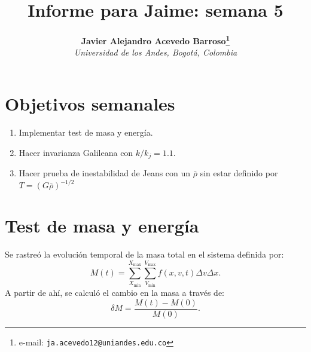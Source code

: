 \documentclass[notitlepage,letterpaper,12pt]{article} %
\begin{document}
\title{Informe para Jaime: semana 5}
\author{
\textbf{Javier Alejandro Acevedo Barroso\thanks{e-mail: \texttt{ja.acevedo12@uniandes.edu.co}}}\\
\textit{Universidad de los Andes, Bogotá, Colombia}\\
} %

\maketitle %






 

\section{Objetivos semanales}
\begin{enumerate}
\item Implementar test de masa y energía.
\item Hacer invarianza Galileana con $k/k_j = 1.1$.
\item Hacer prueba de inestabilidad de Jeans con un $\bar{\rho}$ sin estar definido por $T = (G \bar{\rho})^{-1/2}$


\end{enumerate}

\section{Test de masa y energía}
Se rastreó la evolución temporal de la masa total en el sistema definida por:
\begin{equation}
M(t) = \sum_{X_\text{min}}^{X_\text{max}} \sum_{V_\text{min}}^{V_\text{max}} f(x,v,t) \Delta v \Delta x.
\end{equation}
A partir de ahí, se calculó el cambio en la masa a través de: 
\begin{equation}
\delta M = \frac{M(t) - M(0)}{M(0)}.
\end{equation}
\end{document}
